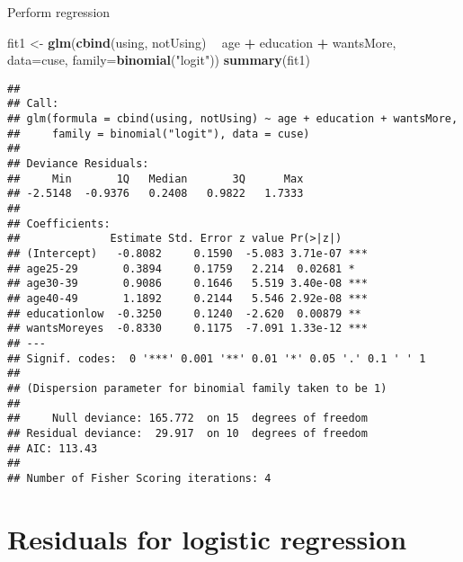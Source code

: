 \documentclass[
  ignorenonframetext,
]{beamer}
\newenvironment{Shaded}{\begin{snugshade}}{\end{snugshade}}
\newcommand{\DataTypeTok}[1]{\textcolor[rgb]{0.13,0.29,0.53}{#1}}
\newcommand{\KeywordTok}[1]{\textcolor[rgb]{0.13,0.29,0.53}{\textbf{#1}}}
\newcommand{\NormalTok}[1]{#1}
\newcommand{\OperatorTok}[1]{\textcolor[rgb]{0.81,0.36,0.00}{\textbf{#1}}}
\newcommand{\StringTok}[1]{\textcolor[rgb]{0.31,0.60,0.02}{#1}}
\begin{document}
\begin{frame}[fragile]{Perform regression}
\protect\hypertarget{perform-regression}{}

\tiny

\begin{Shaded}
\begin{Highlighting}[]
\NormalTok{fit1 <-}\StringTok{ }\KeywordTok{glm}\NormalTok{(}\KeywordTok{cbind}\NormalTok{(using, notUsing) }\OperatorTok{~}\StringTok{ }\NormalTok{age }\OperatorTok{+}\StringTok{ }\NormalTok{education }\OperatorTok{+}\StringTok{ }\NormalTok{wantsMore, }
           \DataTypeTok{data=}\NormalTok{cuse, }\DataTypeTok{family=}\KeywordTok{binomial}\NormalTok{(}\StringTok{"logit"}\NormalTok{))}
\KeywordTok{summary}\NormalTok{(fit1)}
\end{Highlighting}
\end{Shaded}

\begin{verbatim}
## 
## Call:
## glm(formula = cbind(using, notUsing) ~ age + education + wantsMore, 
##     family = binomial("logit"), data = cuse)
## 
## Deviance Residuals: 
##     Min       1Q   Median       3Q      Max  
## -2.5148  -0.9376   0.2408   0.9822   1.7333  
## 
## Coefficients:
##              Estimate Std. Error z value Pr(>|z|)    
## (Intercept)   -0.8082     0.1590  -5.083 3.71e-07 ***
## age25-29       0.3894     0.1759   2.214  0.02681 *  
## age30-39       0.9086     0.1646   5.519 3.40e-08 ***
## age40-49       1.1892     0.2144   5.546 2.92e-08 ***
## educationlow  -0.3250     0.1240  -2.620  0.00879 ** 
## wantsMoreyes  -0.8330     0.1175  -7.091 1.33e-12 ***
## ---
## Signif. codes:  0 '***' 0.001 '**' 0.01 '*' 0.05 '.' 0.1 ' ' 1
## 
## (Dispersion parameter for binomial family taken to be 1)
## 
##     Null deviance: 165.772  on 15  degrees of freedom
## Residual deviance:  29.917  on 10  degrees of freedom
## AIC: 113.43
## 
## Number of Fisher Scoring iterations: 4
\end{verbatim}

\end{frame}

\hypertarget{residuals-for-logistic-regression}{%
\section{Residuals for logistic
regression}\label{residuals-for-logistic-regression}}
\end{document}
